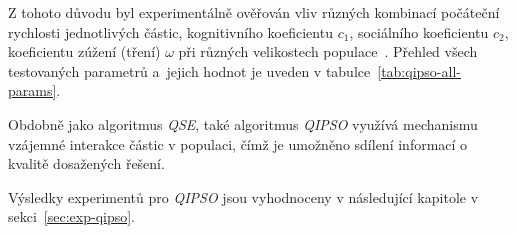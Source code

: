 Z tohoto důvodu byl experimentálně ověřován vliv různých kombinací počáteční rychlosti jednotlivých částic, kognitivního koeficientu $c_1$, sociálního koeficientu $c_2$, koeficientu zúžení (tření) $\omega$ při různých velikostech populace~\cite{pso-app, PSO-c1c2w,PSO-X}. 
Přehled všech testovaných parametrů a~jejich hodnot je uveden v tabulce~\ref{tab:qipso-all-params}.

Obdobně jako algoritmus \emph{QSE}, také algoritmus \emph{QIPSO} využívá mechanismu vzájemné interakce částic v populaci, čímž je umožněno sdílení informací o kvalitě dosažených řešení. 

Výsledky experimentů pro \emph{QIPSO} jsou vyhodnoceny v následující kapitole v sekci~\ref{sec:exp-qipso}.
